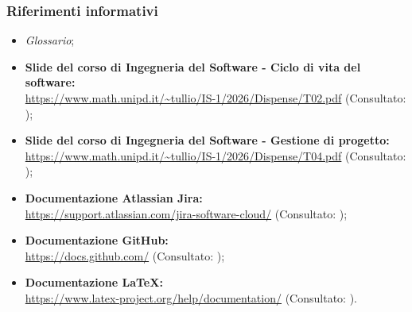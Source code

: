 \subsubsection{Riferimenti informativi}
\begin{itemize}
    \item \textit{Glossario};
    \item \textbf{Slide del corso di Ingegneria del Software - Ciclo di vita del software:} \\
    \url{https://www.math.unipd.it/~tullio/IS-1/2026/Dispense/T02.pdf} (Consultato: );
    \item \textbf{Slide del corso di Ingegneria del Software - Gestione di progetto:} \\
    \url{https://www.math.unipd.it/~tullio/IS-1/2026/Dispense/T04.pdf} (Consultato: );
    \item \textbf{Documentazione Atlassian Jira:} \\
    \url{https://support.atlassian.com/jira-software-cloud/} (Consultato: );
    \item \textbf{Documentazione GitHub:} \\
    \url{https://docs.github.com/} (Consultato: );
    \item \textbf{Documentazione \LaTeX:} \\
    \url{https://www.latex-project.org/help/documentation/} (Consultato: ).
\end{itemize}

